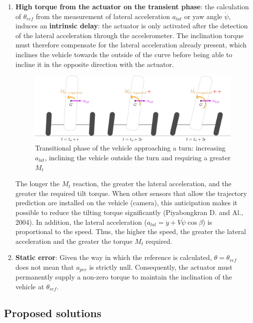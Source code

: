 \begin{enumerate}
\item \textbf{High torque from the actuator on the transient phase}: the calculation of $\theta_{ref}$ from the measurement of lateral acceleration $a_{lat}$ or yaw angle $\dot{\psi}$, induces an \textbf{intrinsic delay}: the actuator is only activated after the detection of the lateral acceleration through the accelerometer. The inclination torque must therefore compensate for the lateral acceleration already present, which inclines the vehicle towards the outside of the curve before being able to incline it in the opposite direction with the actuator. 

\begin{figure}[!h]
	\includegraphics[width=1.0\linewidth]{figs/03/torque}
	\caption{Transitional phase of the vehicle approaching a turn: increasing $a_{lat}$, inclining the vehicle outside the turn and requiring a greater $M_t$}
	\label{torque}
\end{figure}

The longer the $M_t$ reaction, the greater the lateral acceleration, and the greater the required tilt torque. When other sensors that allow the trajectory prediction are installed on the vehicle (camera), this anticipation makes it possible to reduce the tilting torque significantly (Piyabongkran D. and Al., 2004)\cite[0cm]{piyabongkarn2004active}. In addition, the lateral acceleration ($a_{lat}=\ddot{y}+V\dot{\psi}\cos\beta$) is proportional to the speed. Thus, the higher the speed, the greater the lateral acceleration and the greater the torque $M_t$ required.
\newpage
\item \textbf{Static error}: Given the way in which the reference is calculated,  $\theta=\theta_{ref}$ does not mean that $a_{per}$ is strictly null. Consequently, the actuator must permanently supply a non-zero torque to maintain the inclination of the vehicle at $\theta_{ref}$.
\end{enumerate}
\subsection{Proposed solutions} 

